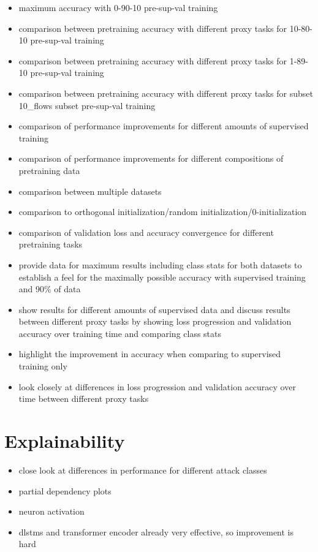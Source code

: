 \begin{itemize}
	\item maximum accuracy with 0-90-10 pre-sup-val training
	\item comparison between pretraining accuracy with different proxy tasks for 10-80-10 pre-sup-val training
	\item comparison between pretraining accuracy with different proxy tasks for 1-89-10 pre-sup-val training
	\item comparison between pretraining accuracy with different proxy tasks for subset 10\_flows subset pre-sup-val training
	\item comparison of performance improvements for different amounts of supervised training
	\item comparison of performance improvements for different compositions of pretraining data
	\item comparison between multiple datasets
	\item comparison to orthogonal initialization/random initialization/0-initialization
	\item comparison of validation loss and accuracy convergence for different pretraining tasks
	\item provide data for maximum results including class stats for both datasets to establish a feel for the maximally possible accuracy with supervised training and 90\% of data
	\item show results for different amounts of supervised data and discuss results between different proxy tasks by showing loss progression and validation accuracy over training time and comparing class stats
	\item highlight the improvement in accuracy when comparing to supervised training only
	\item look closely at differences in loss progression and validation accuracy over time between different proxy tasks
\end{itemize}

\section{Explainability}



\begin{itemize}
	\item close look at differences in performance for different attack classes
	\item partial dependency plots
	\item neuron activation
	\item \gls{dlstm}s and transformer encoder already very effective, so improvement is hard
\end{itemize}

\newpage
